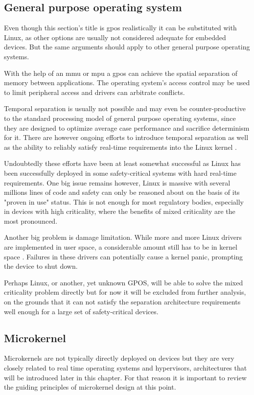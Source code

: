 \subsection{General purpose operating system}
Even though this section's title is \acrfull{gpos} realistically it can be substituted with Linux, as other options are usually not considered adequate for embedded devices. But the same arguments should apply to other general purpose operating systems.

With the help of an \acrfull{mmu} or \acrfull{mpu}  a \acrshort{gpos} can achieve the spatial separation of memory between applications. The operating system's access control may be used to limit peripheral access and drivers can arbitrate conflicts. 

Temporal separation is usually not possible and may even be counter-productive to the standard processing model of general purpose operating systems, since they are designed to optimize average case performance and sacrifice determinism for it. There are however ongoing efforts to introduce temporal separation as well as the ability to reliably satisfy real-time requirements into the Linux kernel \cite{SiroArthur.2007}.

Undoubtedly these efforts have been at least somewhat successful as Linux has been successfully deployed in some safety-critical systems with hard real-time requirements. One big issue remains however, Linux is massive with several millions lines of code and safety can only be reasoned about on the basis of its "proven in use" status. This is not enough for most regulatory bodies, especially in devices with high criticality, where the benefits of mixed criticality are the most pronounced.

Another big problem is damage limitation. While more and more Linux drivers are implemented in user space, a considerable amount still has to be in kernel space . Failures in these drivers can potentially cause a kernel panic, prompting the device to shut down. 

Perhaps Linux, or another, yet unknown GPOS, will be able to solve the mixed criticality problem directly but for now it will be excluded from further analysis, on the grounds that it can not satisfy the separation architecture requirements well enough for a large set of safety-critical devices.
\subsection{Microkernel}
Microkernels are not typically directly deployed on devices but they are very closely related to real time operating systems and hypervisors, architectures that will be introduced later in this chapter. For that reason it is important to review the guiding principles of  microkernel design at this point.

